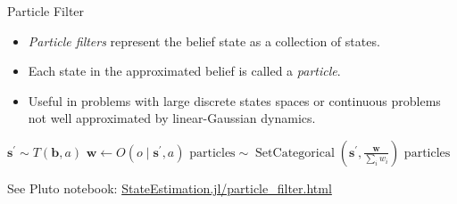 \begin{frame}[fragile]{Particle Filter}


\begin{itemize}
    \item \textit{Particle filters} represent the belief state as a collection of states.
    \item Each state in the approximated belief is called a \textit{particle}.
    \item Useful in problems with large discrete states spaces or continuous problems not well approximated by linear-Gaussian dynamics.
\end{itemize}

\begin{algorithm}[H]
    \caption{Particle filter algorithm.}
    \label{alg:particle_filter}
    \begin{algorithmic}
    \State $\mathbf{s}^\prime \sim T(\mathbf{b}, a)$ 
    \State $\mathbf{w} \leftarrow O(o \mid \mathbf{s}^\prime, a)$ 
    \State $\text{particles} \sim \operatorname{SetCategorical}\left(\mathbf{s}^\prime, \frac{\mathbf{w}}{\sum_i w_i}\right)$ 
    \State \Return $\text{particles}$
    \EndFunction
    \end{algorithmic}
\end{algorithm}

See Pluto notebook: \href{http://htmlpreview.github.io/?https://raw.githubusercontent.com/mossr/StateEstimation.jl/master/html/particle_filter.html}{\color{cardinal}StateEstimation.jl/particle\_filter.html}

\end{frame}